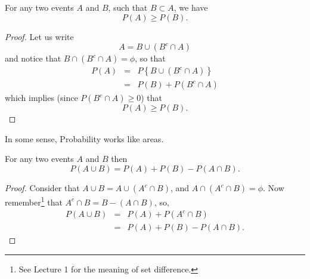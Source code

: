 \documentclass[notes=show,handout]{beamer}\usepackage[]{graphicx}\usepackage[]{color}
\newcommand{\bea}{\begin{eqnarray}}
\newcommand{\eea}{\end{eqnarray}}
\newcommand{\nn}{\nonumber}
\begin{document}
\begin{frame}{\secname}
  \begin{theorem}
  For any two events $A$ and $B$, such that $B \subset A$, we have
  $$
  P(A) \geq P(B).
  $$
  \end{theorem} \vspace{0.1cm}
  \begin{footnotesize}
  \begin{proof}
  Let us write
  $$A = B \cup (B^c \cap A) $$
  and notice that $B \cap (B^c \cap A) = \phi$, so that
  \bea
  P(A) &=& P\left\{ B \cup (B^c \cap A)   \right\} \nn \\
  &=& P(B) + P(B^c \cap A) \nn
  \eea
  which implies (since $P(B^c \cap A) \geq 0$) that
  $$
  P(A) \geq   P(B).
  $$

  \end{proof}
  \end{footnotesize}
\end{frame}

\begin{frame}{\secname}
  \def\firstcircle{(3,1) circle (2.95cm)}
  \def\secondcircle{(1:3cm) circle (1.65cm)}

  \hspace{3cm} \vspace{2cm}
  \begin{center}
  In some sense, Probability works like areas.
  \end{center}
\end{frame}


\begin{frame}{\secname}
  \begin{theorem}
  For any two events $A$ and $B$ then
  $$
  P(A \cup B) = P(A) + P(B) - P(A \cap B).
  $$
  \end{theorem}
  \vspace{0.1cm}
  \begin{footnotesize}
  \begin{proof}
  Consider that $A\cup B = A \cup (A^c \cap B)$, and $A\cap(A^c \cap B) = \phi$. Now remember\footnote{See Lecture 1 for the meaning of set difference.} that $A^c \cap B = B -(A \cap B)$, so,
  \bea
  P(A\cup B) &=& P(A) + P(A^c \cap B) \nn \\
  &=& P(A) + P(B) - P(A\cap B). \nn
  \eea

  \end{proof}
  \end{footnotesize}
\end{frame}
\end{document}

